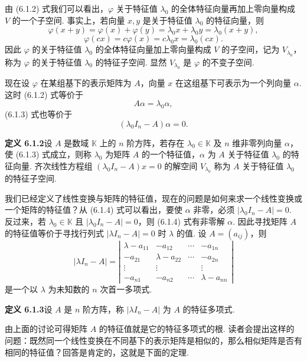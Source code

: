 \documentclass[UTF8,12pt,a4paper,fontset=fandol]{ctexart}
\begin{document}
由 (6.1.2) 式我们可以看出，$\varphi$ 关于特征值 $\lambda_0$ 的全体特征向量再加上零向量构成 $V$ 的一个子空间. 事实上，若向量 $x,y$ 是关于特征值 $\lambda_0$ 的特征向量，则
\[
\varphi(x+y)=\varphi(x)+\varphi(y)=\lambda_0x+\lambda_0y=\lambda_0(x+y),
\]
\[
\varphi(cx)=c\varphi(x)=c\lambda_0x=\lambda_0(cx).
\]
因此 $\varphi$ 的关于特征值 $\lambda_0$ 的全体特征向量加上零向量构成 $V$ 的子空间，记为 $V_{\lambda_0}$，称为 $\varphi$ 的关于特征值 $\lambda_0$ 的特征子空间. 显然 $V_{\lambda_0}$ 是 $\varphi$ 的不变子空间.

现在设 $\varphi$ 在某组基下的表示矩阵为 $A$，向量 $x$ 在这组基下可表示为一个列向量 $\alpha$. 这时 (6.1.2) 式等价于
\begin{equation}
A\alpha=\lambda_0\alpha,
\tag{6.1.3}
\end{equation}
(6.1.3) 式也等价于
\begin{equation}
(\lambda_0I_n-A)\alpha=0.
\tag{6.1.4}
\end{equation}

\noindent\textbf{定义 6.1.2}\quad 设 $A$ 是数域 $\mathbb{K}$ 上的 $n$ 阶方阵，若存在 $\lambda_0\in\mathbb{K}$ 及 $n$ 维非零列向量 $\alpha$，使 (6.1.3) 式成立，则称 $\lambda_0$ 为矩阵 $A$ 的一个特征值，$\alpha$ 为 $A$ 关于特征值 $\lambda_0$ 的特征向量. 齐次线性方程组 $(\lambda_0I_n-A)x=0$ 的解空间 $V_{\lambda_0}$ 称为 $A$ 关于特征值 $\lambda_0$ 的特征子空间.

我们已经定义了线性变换与矩阵的特征值，现在的问题是如何来求一个线性变换或一个矩阵的特征值？从 (6.1.4) 式可以看出，要使 $\alpha$ 非零，必须 $|\lambda_0I_n-A|=0$. 反过来，若 $\lambda_0\in\mathbb{K}$ 且 $|\lambda_0I_n-A|=0$，则 (6.1.4) 式有非零解 $\alpha$. 因此寻找矩阵 $A$ 的特征值等价于寻找行列式 $|\lambda I_n-A|=0$ 时 $\lambda$ 的值. 设 $A=(a_{ij})$，则
\begin{equation}
|\lambda I_n-A|=
\left|\begin{array}{cccc}
\lambda-a_{11} & -a_{12} & \cdots & -a_{1n}\\
-a_{21} & \lambda-a_{22} & \cdots & -a_{2n}\\
\vdots & \vdots & & \vdots\\
-a_{n1} & -a_{n2} & \cdots & \lambda-a_{nn}
\end{array}\right|
\tag{6.1.5}
\end{equation}
是一个以 $\lambda$ 为未知数的 $n$ 次首一多项式.

\noindent\textbf{定义 6.1.3}\quad 设 $A$ 是 $n$ 阶方阵，称 $|\lambda I_n-A|$ 为 $A$ 的特征多项式.

由上面的讨论可得矩阵 $A$ 的特征值就是它的特征多项式的根. 读者会提出这样的问题：既然同一个线性变换在不同基下的表示矩阵是相似的，那么相似矩阵是否有相同的特征值？回答是肯定的，这就是下面的定理.
\end{document}
